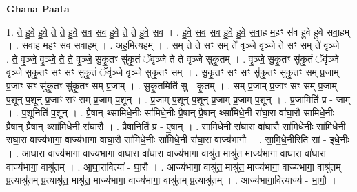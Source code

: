 \documentclass[17pt]{extarticle}
\begin{document}
\textbf{Ghana Paata } \newline

1. ते॒ हु॒वे॒ हु॒वे॒ ते॒ ते॒ हु॒वे॒ स॒व॒ स॒व॒ हु॒वे॒ ते॒ ते॒ हु॒वे॒ स॒व॒ । . हु॒वे॒ स॒व॒ स॒व॒ हु॒वे॒ हु॒वे॒ स॒वा॒ह म॒हꣳ स॑व हुवे हुवे सवा॒हम् । . स॒वा॒ह म॒हꣳ स॑व सवा॒हम् । . अ॒ह॒मित्य॒हम् । . सम् ते॑ ते॒ सꣳ सम् ते॑ वृञ्जे वृञ्जे ते॒ सꣳ सम् ते॑ वृञ्जे । . ते॒ वृ॒ञ्जे॒ वृ॒ञ्जे॒ ते॒ ते॒ वृ॒ञ्जे॒ सु॒कृ॒तꣳ सु॑कृ॒तं ॅवृ॑ञ्जे ते ते वृञ्जे सुकृ॒तम् । . वृ॒ञ्जे॒ सु॒कृ॒तꣳ सु॑कृ॒तं ॅवृ॑ञ्जे वृञ्जे सुकृ॒तꣳ सꣳ सꣳ सु॑कृ॒तं ॅवृ॑ञ्जे वृञ्जे सुकृ॒तꣳ सम् । . सु॒कृ॒तꣳ सꣳ सꣳ सु॑कृ॒तꣳ सु॑कृ॒तꣳ सम् प्र॒जाम् प्र॒जाꣳ सꣳ सु॑कृ॒तꣳ सु॑कृ॒तꣳ सम् प्र॒जाम् । . सु॒कृ॒तमिति॑ सु - कृ॒तम् । . सम् प्र॒जाम् प्र॒जाꣳ सꣳ सम् प्र॒जाम् प॒शून् प॒शून् प्र॒जाꣳ सꣳ सम् प्र॒जाम् प॒शून् । . प्र॒जाम् प॒शून् प॒शून् प्र॒जाम् प्र॒जाम् प॒शून् । . प्र॒जामिति॑ प्र - जाम् । . प॒शूनिति॑ प॒शून् । . प्रै॒षान् थ्सा॑मिधे॒नीः सा॑मिधे॒नीः प्रै॒षान् प्रै॒षान् थ्सा॑मिधे॒नी रा॑घा॒रा वा॑घा॒रौ सा॑मिधे॒नीः प्रै॒षान् प्रै॒षान् थ्सा॑मिधे॒नी रा॑घा॒रौ । . प्रै॒षानिति॑ प्र - ए॒षान् । . सा॒मि॒धे॒नी रा॑घा॒रा वा॑घा॒रौ सा॑मिधे॒नीः सा॑मिधे॒नी रा॑घा॒रा वाज्य॑भागा॒ वाज्य॑भागा वाघा॒रौ सा॑मिधे॒नीः सा॑मिधे॒नी रा॑घा॒रा वाज्य॑भागौ । . सा॒मि॒धे॒नीरिति॑ सां - इ॒धे॒नीः । . आ॒घा॒रा वाज्य॑भागा॒ वाज्य॑भागा वाघा॒रा वा॑घा॒रा वाज्य॑भागा॒ वाश्रु॑त॒ माश्रु॑त॒ माज्य॑भागा वाघा॒रा वा॑घा॒रा वाज्य॑भागा॒ वाश्रु॑तम् । . आ॒घा॒रावित्या᳚ - घा॒रौ । . आज्य॑भागा॒ वाश्रु॑त॒ माश्रु॑त॒ माज्य॑भागा॒ वाज्य॑भागा॒ वाश्रु॑तम् प्र॒त्याश्रु॑तम् प्र॒त्याश्रु॑त॒ माश्रु॑त॒ माज्य॑भागा॒ वाज्य॑भागा॒ वाश्रु॑तम् प्र॒त्याश्रु॑तम् । . आज्य॑भागा॒वित्याज्य॑ - भा॒गौ॒ । \newline
\end{document}
